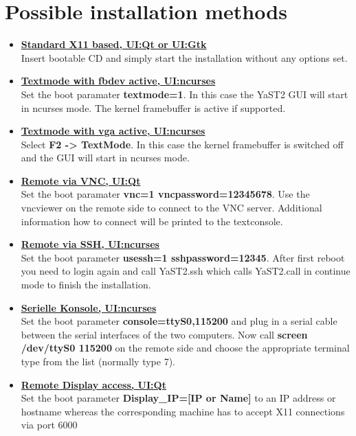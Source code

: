 \chapter{Possible installation methods}

\begin{itemize}
\item \textbf{\underline{Standard X11 based, UI:Qt or UI:Gtk}}\\
      Insert bootable CD and simply start the installation without
      any options set.
\item \textbf{\underline{Textmode with fbdev active, UI:ncurses}}\\
      Set the boot paramater \textbf{textmode=1}. In this case the
      YaST2 GUI will start in ncurses mode. The kernel framebuffer
      is active if supported.
\item \textbf{\underline{Textmode with vga active, UI:ncurses}}\\
      Select \textbf{F2 -> TextMode}. In this case the kernel framebuffer
      is switched off and the GUI will start in ncurses mode.
\item \textbf{\underline{Remote via VNC, UI:Qt}}\\
      Set the boot paramater \textbf{vnc=1 vncpassword=12345678}. Use
      the vncviewer on the remote side to connect to the VNC server.
      Additional information how to connect will be printed to the
      textconsole.
\item \textbf{\underline{Remote via SSH, UI:ncurses}}\\
      Set the boot parameter \textbf{usessh=1 sshpassword=12345}.
      After first reboot you need to login again and call
      YaST2.ssh which calls YaST2.call in continue mode to finish the
      installation.
\item \textbf{\underline{Serielle Konsole, UI:ncurses}}\\
      Set the boot parameter \textbf{console=ttyS0,115200} and plug in a
      serial cable between the serial interfaces of the two computers. Now
      call \textbf{screen /dev/ttyS0 115200} on the remote side and choose
      the appropriate terminal type from the list (normally type 7).
\item \textbf{\underline{Remote Display access, UI:Qt}}\\
      Set the boot parameter \textbf{Display\_IP=[IP or Name]} to an
      IP address or hostname whereas the corresponding machine has to accept
      X11 connections via port 6000
\end{itemize}
